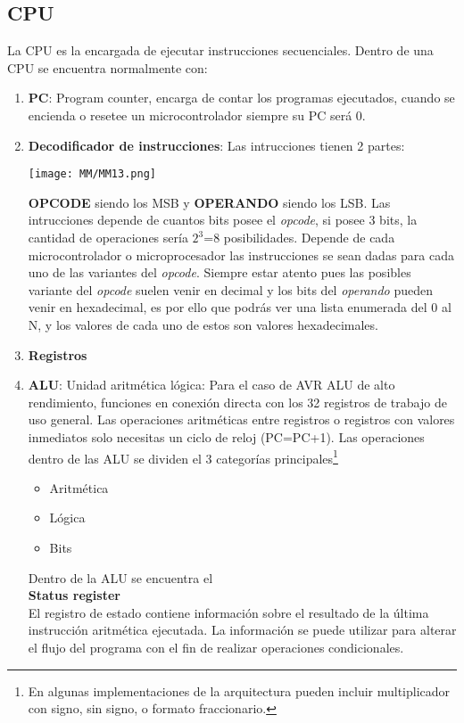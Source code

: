 \documentclass[
	12pt, %
	fleqn, %
	a4paper, %
]{LegrandOrangeBook}
\begin{document}
\subsection{CPU}
La CPU es la encargada de ejecutar instrucciones secuenciales. Dentro de una CPU se encuentra normalmente con:
\begin{enumerate}
\item \textbf{PC}: Program counter, encarga de contar los programas ejecutados, cuando se encienda o resetee un microcontrolador siempre su PC será 0.
\item \textbf{Decodificador de instrucciones}: Las intrucciones tienen 2 partes:\\
\begin{center}
\texttt{[image: MM/MM13.png]}
\end{center}
\textbf{OPCODE} siendo los MSB y \textbf{OPERANDO} siendo los LSB. Las intrucciones depende de cuantos bits posee el \textit{opcode}, si posee 3 bits, la cantidad de operaciones sería $2^3$=8 posibilidades. Depende de cada microcontrolador o microprocesador las instrucciones se sean dadas para cada uno de las variantes del \textit{opcode}. Siempre estar atento pues las posibles variante del \textit{opcode} suelen venir en decimal y los bits del \textit{operando} pueden venir en hexadecimal, es por ello que podrás ver una lista enumerada del 0 al N, y los valores de cada uno de estos son valores hexadecimales.
\item \textbf{Registros}
\item \textbf{ALU}: Unidad aritmética lógica: Para el caso de AVR ALU de alto rendimiento, funciones en conexión directa con los 32 registros de trabajo de uso general. Las operaciones aritméticas entre registros o registros con valores inmediatos solo necesitas un ciclo de reloj (PC=PC+1). Las operaciones dentro de las ALU se dividen el 3 categorías principales\footnote{En algunas implementaciones de la arquitectura pueden incluir multiplicador con signo, sin signo, o formato fraccionario.}
\begin{itemize}
\item Aritmética
\item Lógica
\item Bits
\end{itemize}
Dentro de la ALU se encuentra el\\ \textbf{Status register}\\
El registro de estado contiene información sobre el resultado de la última instrucción aritmética ejecutada. La información se puede utilizar para alterar el flujo del programa con el fin de realizar operaciones condicionales.

\end{enumerate}
\end{document}

